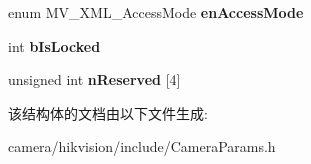 \begin{DoxyCompactItemize}
\item 
\mbox{\label{struct___m_v___x_m_l___f_e_a_t_u_r_e___command___a1e88574b4ebe67e1231e96c3a88ac43a}} 
enum M\+V\+\_\+\+X\+M\+L\+\_\+\+Access\+Mode {\bfseries en\+Access\+Mode}
\item 
\mbox{\label{struct___m_v___x_m_l___f_e_a_t_u_r_e___command___ad80cf311b812621daff3d9f210f09c7b}} 
int {\bfseries b\+Is\+Locked}
\item 
\mbox{\label{struct___m_v___x_m_l___f_e_a_t_u_r_e___command___a62734b40d3e3baa2f964b8792b76221e}} 
unsigned int {\bfseries n\+Reserved} \mbox{[}4\mbox{]}
\end{DoxyCompactItemize}


该结构体的文档由以下文件生成\+:\begin{DoxyCompactItemize}
\item 
camera/hikvision/include/Camera\+Params.\+h\end{DoxyCompactItemize}
